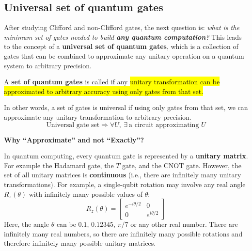 \subsection{Universal set of quantum gates}\label{sec:universal-set-of-quantum-gates}

After studying Clifford and non-Clifford gates, the next question is: \emph{what is the minimum set of gates needed to build \textbf{any quantum computation}?} This leads to the concept of a \textbf{universal set of quantum gates}, which is a collection of gates that can be combined to approximate any unitary operation on a quantum system to arbitrary precision.

\highspace
\begin{definitionbox}
    A \textbf{set of quantum gates} is called  if any \hl{unitary transformation can be approximated to arbitrary accuracy using only gates from that set.}

    \highspace
    In other words, a set of gates is universal if using only gates from that set, we can approximate any unitary transformation to arbitrary precision.
    \begin{equation*}
        \text{Universal gate set} \Longrightarrow \forall U,\ \exists\ \text{a circuit approximating } U
    \end{equation*}
\end{definitionbox}

\begin{flushleft}
    \textcolor{Green3}{ \textbf{Why ``Approximate'' and not ``Exactly''?}}
\end{flushleft}
In quantum computing, every quantum gate is represented by a \textbf{unitary matrix}. For example the Hadamard gate, the $T$ gate, and the CNOT gate. However, the set of all unitary matrices is \textbf{continuous} (i.e., there are infinitely many unitary transformations). For example, a single-qubit rotation may involve any real angle $R_z(\theta)$ with infinitely many possible values of $\theta$:
\begin{equation*}
    R_z(\theta) = \begin{bmatrix}
        e^{-i\theta/2} & 0 \\
        0 & e^{i\theta/2}
    \end{bmatrix}
\end{equation*}
Here, the angle $\theta$ can be $0.1$, $0.12345$, $\pi/7$ or any other real number. There are infinitely many real numbers, so there are infinitely many possible rotations and therefore infinitely many possible unitary matrices.

